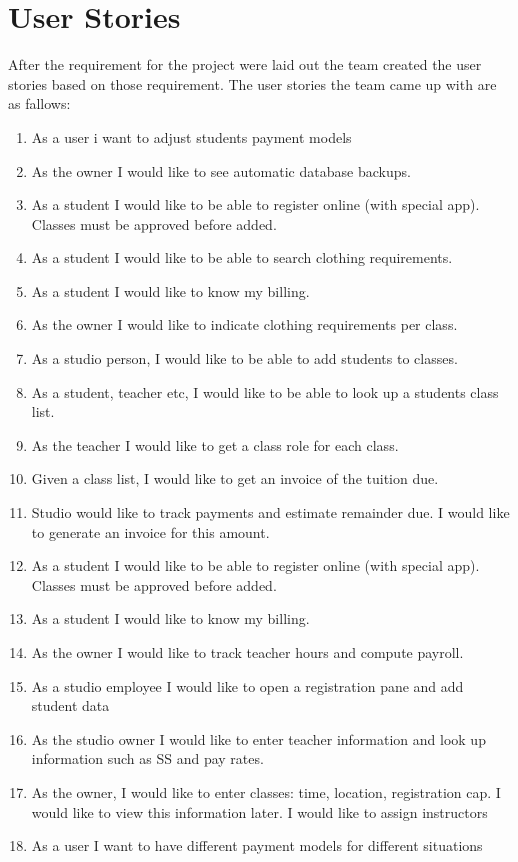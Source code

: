 \section{User Stories}
After the requirement for the project were laid out the team created the user stories based on those requirement. The user stories the team came up with are as fallows:

\begin{enumerate}
  \item As a user i want to adjust students payment models
  \item As the owner I would like to see automatic database backups.
  \item As a student I would like to be able to register online (with special app). Classes must be approved before added.
  \item As a student I would like to be able to search clothing requirements.
  \item As a student I would like to know my billing.
  \item As the owner I would like to indicate clothing requirements per class.
  \item As a studio person, I would like to be able to add students to classes.
  \item  As a student, teacher etc, I would like to be able to look up a students class list.
  \item As the teacher I would like to get a class role for each class.
  \item Given a class list, I would like to get an invoice of the tuition due.
  \item Studio would like to track payments and estimate remainder due.  I would like to generate an invoice for this amount.
  \item As a student I would like to be able to register online (with special app).   Classes must be approved before added.
  \item As a student I would like to know my billing.
  \item As the owner I would like to track teacher hours and compute payroll.
  \item As a studio employee I would like to open a registration pane and add student data
  \item As the studio owner I would like to enter teacher information and look up information such as SS and pay rates.
  \item As the owner, I would like to enter classes: time, location, registration cap. I would like to view this information later. I would like to assign instructors
  \item As a user I want to have different payment models for different situations
\end{enumerate}




